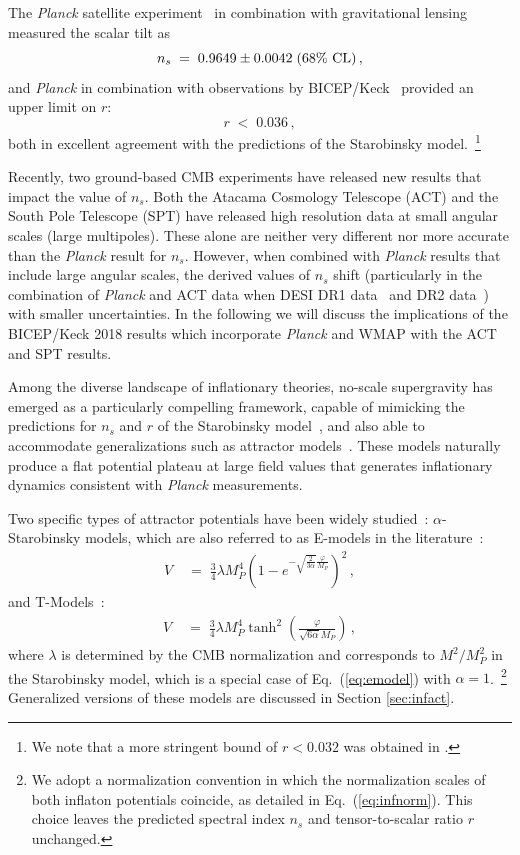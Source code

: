 \documentclass[aps,prev,twocolumn,preprintnumbers,floatfix,nofootinbib]{revtex4-1}
\newcommand{\beq}{\begin{equation}}
\newcommand{\eeq}{\end{equation}}
\begin{document}
The \textit{Planck} satellite experiment~\cite{Planck} in combination with gravitational lensing measured the scalar tilt as
\beq
n_s \; = \; 0.9649 \pm 0.0042 \; (68\%~{\rm CL}) \, ,
\label{nsexp}
\eeq 
and \textit{Planck} in combination with observations by BICEP/Keck~\cite{BICEP2021} 
provided an upper limit on $r$:
\beq
r \; < \; 0.036 \, ,
\label{rlim}
\eeq
both in excellent agreement with the predictions of the Starobinsky model.~\footnote{We note that a more stringent bound of $r < 0.032$ was obtained in \cite{Tristram:2021tvh}.}

Recently, two ground-based CMB experiments have released new results that impact the value  of $n_s$.  Both the Atacama Cosmology Telescope (ACT) \cite{ACT:2025fju,ACT:2025tim} and the South Pole Telescope (SPT) \cite{SPT-3G:2025bzu} have released high resolution data at small angular scales (large multipoles). These alone are neither very different nor more accurate  than the \textit{Planck} result for $n_s$.
However, when combined with \textit{Planck} results that include large angular scales, the derived values of $n_s$ shift (particularly in the combination of \textit{Planck} and ACT data when
DESI DR1 data~\cite{DESI:2024uvr, DESI:2024mwx} and DR2 data~\cite{DESI:2025zpo,DESI:2025zgx}) with smaller uncertainties. 
In the following we will discuss the implications of the BICEP/Keck 2018 results which incorporate \textit{Planck} and WMAP \cite{BICEP2021} with the ACT and SPT results. 

Among the diverse landscape of inflationary theories, no-scale supergravity \cite{no-scale,LN} has emerged as a particularly compelling framework, capable of mimicking the predictions for $n_s$ and $r$ of the Starobinsky model~\cite{ENO6}, and also able to accommodate generalizations such as attractor models~\cite{ENO7,Kallosh:2013hoa,T-model,KLR}. These models naturally produce a flat potential plateau at large field values that generates inflationary dynamics consistent with {\it Planck} measurements.

Two specific types of attractor potentials have been widely studied~\cite{ENO7,KLR,T-model,e-m,Carrasco:2015rva,ENOV3}: $\alpha$-Starobinsky models, which are also referred to as E-models in the literature~\cite{e-m}:
\begin{align}
V & \; = \; \frac{3}{4} \lambda  M_{P}^{4}\left(1-e^{-\sqrt{\frac{2}{3 \alpha}} \frac{\varphi}{M_{P}}}\right)^{2} \, ,
\label{eq:emodel}
\end{align}
and T-Models~\cite{Carrasco:2015rva}:
\begin{align}
\label{eq:tmodel}
V & \; = \; \frac{3}{4}  \lambda M_P^4 \tanh ^{2} \left(\frac{\varphi}{\sqrt{6 \alpha}M_P } \right) \,, 
\end{align}
where $\lambda$ is determined by the CMB normalization and corresponds to $M^2/M_P^2$ in the Starobinsky model, which is a special case of Eq.~(\ref{eq:emodel}) with $\alpha = 1$.~\footnote{We adopt a normalization convention in which the normalization scales of both inflaton potentials coincide, as detailed in Eq.~(\ref{eq:infnorm}). This choice leaves the predicted spectral index $n_s$ and tensor-to-scalar ratio $r$ unchanged.} Generalized versions of these models are discussed in Section \ref{sec:infact}.
\end{document}
